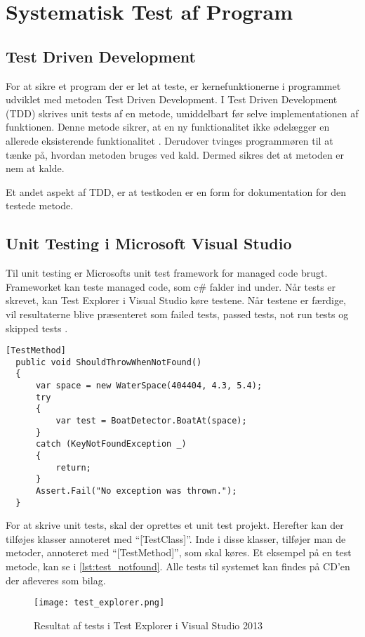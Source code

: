 \section{Systematisk Test af Program}
\label{sec:systematisk_test_af_program}

\subsection{Test Driven Development}
\label{sub:test_driven_development}

For at sikre et program der er let at teste, er kernefunktionerne i programmet udviklet med metoden Test Driven Development. I Test Driven Development (TDD) skrives unit tests af en metode, umiddelbart før selve implementationen af funktionen. Denne metode sikrer, at en ny funktionalitet ikke ødelægger en allerede eksisterende funktionalitet \cite{martin2006agile}. Derudover tvinges programmøren til at tænke på, hvordan metoden bruges ved kald. Dermed sikres det at metoden er nem at kalde.

Et andet aspekt af TDD, er at testkoden er en form for dokumentation for den testede metode.

\subsection{Unit Testing i Microsoft Visual Studio}
\label{sub:unit_testing_i_microsoft_visual_studio}

Til unit testing er Microsofts unit test framework for managed code brugt. Frameworket kan teste managed code, som c\# falder ind under. Når tests er skrevet, kan Test Explorer i Visual Studio køre testene. Når testene er færdige, vil resultaterne blive præsenteret som failed tests, passed tests, not run tests og skipped tests \cite{msdn_unittest}.

\begin{lstlisting}[label=lst:test_notfound, caption={Eksempel på testfunktion}]
  [TestMethod]
  public void ShouldThrowWhenNotFound()
  {
      var space = new WaterSpace(404404, 4.3, 5.4);
      try
      {
          var test = BoatDetector.BoatAt(space);
      }
      catch (KeyNotFoundException _)
      {
          return;
      }
      Assert.Fail("No exception was thrown.");
  }
\end{lstlisting}

For at skrive unit tests, skal der oprettes et unit test projekt. Herefter kan der tilføjes klasser annoteret med \enquote{[TestClass]}. Inde i disse klasser, tilføjer man de metoder, annoteret med \enquote{[TestMethod]}, som skal køres. Et eksempel på en test metode, kan se i \cref{lst:test_notfound}. Alle tests til systemet kan findes på CD'en der afleveres som bilag.

\begin{figure}
  \centering
  \texttt{[image: test\_explorer.png]}
  \caption{Resultat af tests i Test Explorer i Visual Studio 2013}
  \label{fig:test_explorer}
\end{figure}
